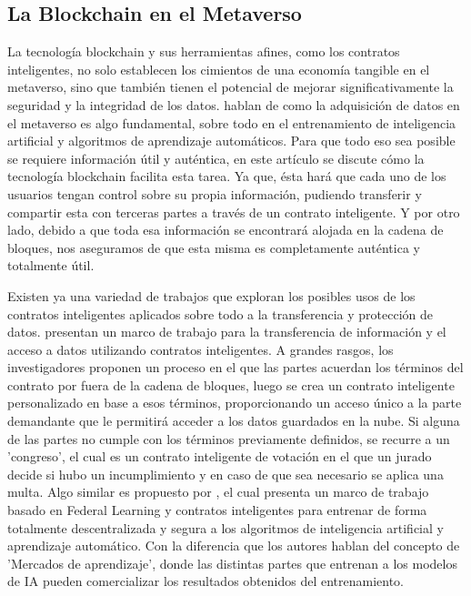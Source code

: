 \documentclass[a4paper,10pt]{article}
\begin{document}
	\subsection{La Blockchain en el Metaverso}
	La tecnología blockchain y sus herramientas afines, como los contratos inteligentes, no solo establecen los cimientos de una economía tangible en el metaverso, sino que también tienen el potencial de mejorar significativamente la seguridad y la integridad de los datos. \textcite{huynh2023blockchain} hablan de como la adquisición de datos en el metaverso es algo fundamental, sobre todo en el entrenamiento de inteligencia artificial y algoritmos de aprendizaje automáticos. Para que todo eso sea posible se requiere información útil y auténtica, en este artículo se discute cómo la tecnología blockchain facilita esta tarea. Ya que, ésta hará que cada uno de los usuarios tengan control sobre su propia información, pudiendo transferir y compartir esta con terceras partes a través de un contrato inteligente. Y por otro lado, debido a que toda esa información se encontrará alojada en la cadena de bloques, nos aseguramos de que esta misma es completamente auténtica y totalmente útil. 
	
	Existen ya una variedad de trabajos que exploran los posibles usos de los contratos inteligentes aplicados sobre todo a la transferencia y protección de datos. \textcite{liu2018enforceable} presentan un marco de trabajo para la transferencia de información y el acceso a datos utilizando contratos inteligentes. A grandes rasgos, los investigadores proponen un proceso en el que las partes acuerdan los términos del contrato por fuera de la cadena de bloques, luego se crea un contrato inteligente personalizado en base a esos términos, proporcionando un acceso único a la parte demandante que le permitirá acceder a los datos guardados en la nube. Si alguna de las partes no cumple con los términos previamente definidos, se recurre a un 'congreso', el cual es un contrato inteligente de votación en el que un jurado decide si hubo un incumplimiento y en caso de que sea necesario se aplica una multa.
	Algo similar es propuesto por \textcite{ouyang2020learning}, el cual presenta un marco de trabajo basado en Federal Learning y contratos inteligentes para entrenar de forma totalmente descentralizada y segura a los algoritmos de inteligencia artificial y aprendizaje automático. Con la diferencia que los autores hablan del concepto de 'Mercados de aprendizaje', donde las distintas partes que entrenan a los modelos de IA pueden comercializar los resultados obtenidos del entrenamiento.
	
\end{document}
